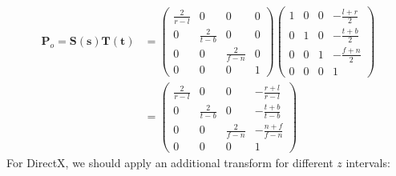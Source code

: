 \documentclass[10pt, a4paper]{article}
\begin{document}
                \begin{align*}
                    \textbf{P}_o = \textbf{S}(\textbf{s})\textbf{T}(\textbf{t}) 
                    &= 
                    \begin{pmatrix}
                        \frac{2}{r - l} & 0 & 0 & 0\\
                        0 & \frac{2}{t - b} & 0 & 0\\
                        0 & 0 & \frac{2}{f - n} & 0\\
                        0 & 0 & 0 & 1
                    \end{pmatrix}
                    \begin{pmatrix}
                        1 & 0 & 0 & -\frac{l + r}{2}\\
                        0 & 1 & 0 & -\frac{t + b}{2}\\
                        0 & 0 & 1 & -\frac{f + n}{2}\\
                        0 & 0 & 0 & 1 
                    \end{pmatrix}\\
                    &=
                    \begin{pmatrix}
                        \frac{2}{r - l} & 0 & 0 & -\frac{r + l}{r - l}\\
                        0 & \frac{2}{t - b} & 0 & -\frac{t + b}{t - b}\\
                        0 & 0 & \frac{2}{f - n} & -\frac{n + f}{f - n}\\
                        0 & 0 & 0 & 1
                    \end{pmatrix}
                \end{align*}
            \indent For DirectX, we should apply an additional transform for different $z$ intervals:
\end{document}

